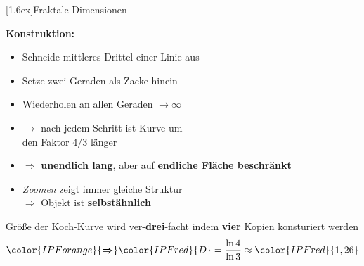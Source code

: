 \documentclass[final]{beamer}
\newlength{\columnheight}
\newlength{\marginw}
\newlength{\tw}
\newlength{\colw}
\newenvironment{myTwoColPoster}{%
  \begin{minipage}[t]{\textwidth}%
    \hspace*{\marginw}%
    \hspace*{9.5bp}%
    \begin{minipage}[t]{\tw}}%
  {\end{minipage}%
   \hspace*{\marginw}%
   \end{minipage}}
\newenvironment{myCol}%
    {\begin{minipage}[t][\columnheight][t]{\colw}}%
    {\end{minipage}}
\newenvironment{textblock}[1]%
    {\begin{block}{\rule[-0.6ex]{0pt}{2.4ex}\raisebox{-0.25ex}[1.6ex]{#1}}%
     \vspace*{5mm}}%
    {\vspace*{5mm}\end{block}}
\begin{document}
\begin{frame}[t]{}
\begin{myTwoColPoster}
\begin{myCol}
\begin{textblock}{Fraktale Dimensionen}
\begin{minipage}[t]{0.38\textwidth}
\begin{center}
    \end{center}
  \end{minipage}\hfill
  \begin{minipage}[t]{0.58\textwidth}
    \vspace*{1.5cm}
    \textbf{ Konstruktion:}
    \begin{itemize} \setlength\itemsep{1.1em} \Large
      \item Schneide mittleres Drittel einer Linie aus
      \item Setze zwei Geraden als Zacke hinein
      \item Wiederholen an allen Geraden $\to\infty$
      \item \textcolor{IPForange}{$\rightarrow$} nach jedem Schritt ist Kurve um\\
      den Faktor $4/3$ l\"anger
      \item \textcolor{IPForange}{$\Rightarrow$} \textbf{unendlich lang}, aber auf \textbf{endliche Fläche beschränkt}
      \item \textit{Zoomen} zeigt immer gleiche Struktur\\[1.2em]
      \textcolor{IPForange}{\textbf{$\Rightarrow$}} Objekt ist \textcolor{IPForange}{\textbf{ selbst\"ahnlich}}
    \end{itemize}
    Gr\"o\ss e der Koch-Kurve wird ver-\textcolor{IPForange}{\textbf{drei}}-facht indem \textcolor{IPForange}{\textbf{vier}} Kopien konsturiert werden
    \begin{align*}
      {\color{IPForange}{\boldsymbol{\Rightarrow}}} {\color{IPFred}{ D }} =\frac{\ln 4}{\ln 3}\approx  \color{IPFred}{1,26}
    \end{align*}
  \end{minipage}


\end{textblock}
\end{myCol}
\end{myTwoColPoster}
\end{frame}
\end{document}
